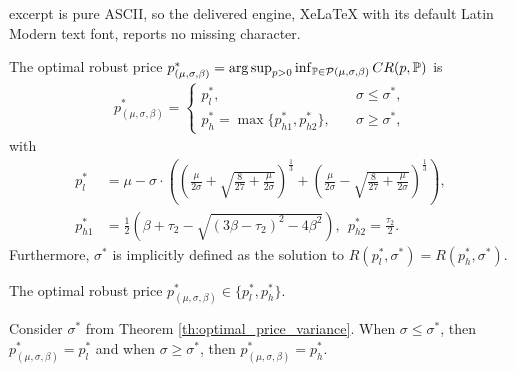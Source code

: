 \documentclass[10pt,a4paper]{amsart}
\newcommand{\bP}{\mathbb{P}}
\newcommand{\cP}{\mathcal{P}}
\begin{document}
excerpt is pure ASCII, so the delivered engine, XeLaTeX with its default Latin Modern text font, reports no missing character.
\begin{theorem}\label{th:optimal_price_variance}
    The optimal robust price $p_{(\mu,\sigma,\beta)}^*=\arg\sup_{p>0}\inf_{\bP\in\cP(\mu,\sigma,\beta)}\textup{CR}(p,\bP)\nonumber$ is
    \begin{align}
        p_{(\mu,\sigma,\beta)}^* = \begin{cases}
            p_l^*, \quad & \sigma \leq \sigma^{*}, \\
            p_h^* = \max\{p_{h1}^*,p_{h2}^*\}, \quad &    \sigma \geq \sigma^{*},
        \end{cases}
    \end{align}
with
\begin{align}
    p_{l}^*&=\mu - \sigma \cdot \left(\left(\frac{\mu}{2\sigma}+\sqrt{\frac{8}{27}+\frac{\mu}{2\sigma}}\right)^{\frac{1}{3}}+\left(\frac{\mu}{2\sigma}-\sqrt{\frac{8}{27}+\frac{\mu}{2\sigma}}\right)^{\frac{1}{3}}\right),\\
    p_{h1}^* &= \frac{1}{2}\left(\beta+\tau_2-\sqrt{(3\beta-\tau_2)^2-4\beta^2}\right),\ \ p_{h2}^* = \frac{\tau_2}{2}.
\end{align}
Furthermore, $\sigma^*$ is implicitly defined as the solution to
$R(p_l^*,\sigma^*) = R(p_h^*,\sigma^*)$. 
\end{theorem}

\begin{lemma}\label{lemma:price1}
    The optimal robust price $p^*_{(\mu,\sigma,\beta)} \in \{p^*_l,p^*_h\}$.
\end{lemma}

\begin{lemma}
    Consider $\sigma^*$ from \textup{Theorem \ref{th:optimal_price_variance}}. When $\sigma \leq \sigma^*$, then $p^*_{(\mu,\sigma,\beta)} = p^*_l$ and when $\sigma \geq \sigma^*$, then $p^*_{(\mu,\sigma,\beta)} = p^*_h$.
\end{lemma}
\end{document}
